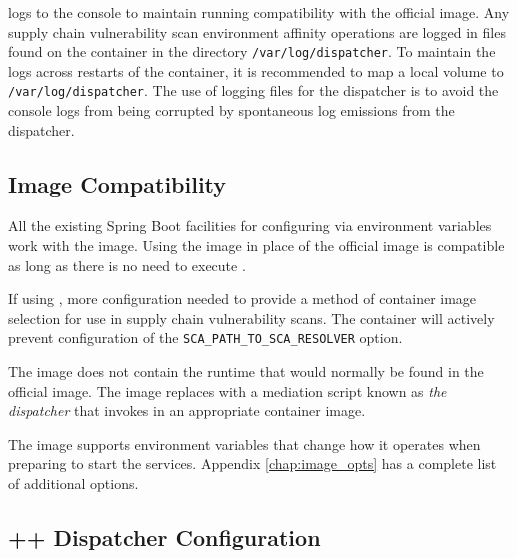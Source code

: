 \cxflow logs to the console to maintain running compatibility with the official \cxflow image.  
Any supply chain vulnerability scan environment affinity operations are logged in files found
on the container in the directory \texttt{/var/log/dispatcher}.  To maintain the logs across
restarts of the container, it is recommended to map a local volume to \texttt{/var/log/dispatcher}.
The use of logging files for the dispatcher is to avoid the console logs from being corrupted
by spontaneous log emissions from the dispatcher.


\subsection{\cxflow Image Compatibility}

All the existing Spring Boot facilities for configuring \cxflow via environment variables work 
with the \cxflowplusplus image.  Using the \cxflowplusplus image in place of the official
\cxflow image is compatible as long as there is no need to execute \scaresolver.

If using \scaresolver, more configuration needed to provide a method of container image selection
for use in supply chain vulnerability scans.  The container will actively prevent
configuration of the \cxflow \texttt{SCA\_PATH\_TO\_SCA\_RESOLVER} option.  

The \cxflowplusplus image does not contain the \scaresolver runtime that would normally be found
in the official \cxflow image.  The \cxflowplusplus image replaces \scaresolver with
a mediation script known as \textit{the dispatcher} that invokes \scaresolver in an appropriate
container image.

The \cxflowplusplus image supports environment variables that change how it operates when 
preparing to start the \cxflow services.  Appendix \ref{chap:image_opts} has a complete list
of \cxflowplusplus additional options.


\subsection{\cxflow++ Dispatcher Configuration}






